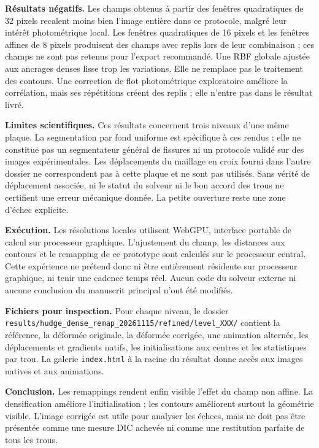 \documentclass[11pt,a4paper,landscape]{article}
\begin{document}
\textbf{Résultats négatifs.} Les champs obtenus à partir des fenêtres quadratiques de 32 pixels
recalent moins bien l'image entière dans ce protocole, malgré leur intérêt photométrique local.
Les fenêtres quadratiques de 16 pixels et les fenêtres affines de 8 pixels produisent des champs
avec replis lors de leur combinaison ; ces champs ne sont pas retenus pour l'export recommandé.
Une RBF globale ajustée aux ancrages denses lisse trop les variations. Elle ne remplace pas
le traitement des contours. Une correction de flot photométrique exploratoire améliore la corrélation,
mais ses répétitions créent des replis ; elle n'entre pas dans le résultat livré.

\textbf{Limites scientifiques.} Ces résultats concernent trois niveaux d'une même plaque.
La segmentation par fond uniforme est spécifique à ces rendus ; elle ne constitue pas un segmentateur
général de fissures ni un protocole validé sur des images expérimentales. Les déplacements du maillage
en croix fourni dans l'autre dossier ne correspondent pas à cette plaque et ne sont pas utilisés.
Sans vérité de déplacement associée, ni le statut du solveur ni le bon accord des trous ne certifient
une erreur mécanique donnée. La petite ouverture reste une zone d'échec explicite.

\textbf{Exécution.} Les résolutions locales utilisent WebGPU, interface portable de calcul sur
processeur graphique. L'ajustement du champ, les distances aux contours et le remapping de ce
prototype sont calculés sur le processeur central. Cette expérience ne prétend donc ni être entièrement
résidente sur processeur graphique, ni tenir une cadence temps réel. Aucun code du solveur externe
ni aucune conclusion du manuscrit principal n'ont été modifiés.

\textbf{Fichiers pour inspection.} Pour chaque niveau, le dossier
\texttt{results/hudge\_dense\_remap\_20261115/refined/level\_XXX/} contient
la référence, la déformée originale, la déformée corrigée, une animation alternée,
les déplacements et gradients natifs, les initialisations aux centres et les statistiques par trou.
La galerie \texttt{index.html} à la racine du résultat donne accès aux images natives et aux animations.

\textbf{Conclusion.} Les remappings rendent enfin visible l'effet du champ non affine.
La densification améliore l'initialisation ; les contours améliorent surtout la géométrie visible.
L'image corrigée est utile pour analyser les échecs, mais ne doit pas être présentée comme une
mesure DIC achevée ni comme une restitution parfaite de tous les trous.
\end{document}
